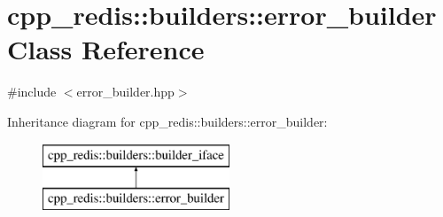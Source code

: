\hypertarget{classcpp__redis_1_1builders_1_1error__builder}{}\section{cpp\+\_\+redis\+:\+:builders\+:\+:error\+\_\+builder Class Reference}
\label{classcpp__redis_1_1builders_1_1error__builder}


{\ttfamily \#include $<$error\+\_\+builder.\+hpp$>$}

Inheritance diagram for cpp\+\_\+redis\+:\+:builders\+:\+:error\+\_\+builder\+:\begin{figure}[H]
\begin{center}
\leavevmode
\includegraphics[height=2.000000cm]{classcpp__redis_1_1builders_1_1error__builder}
\end{center}
\end{figure}
